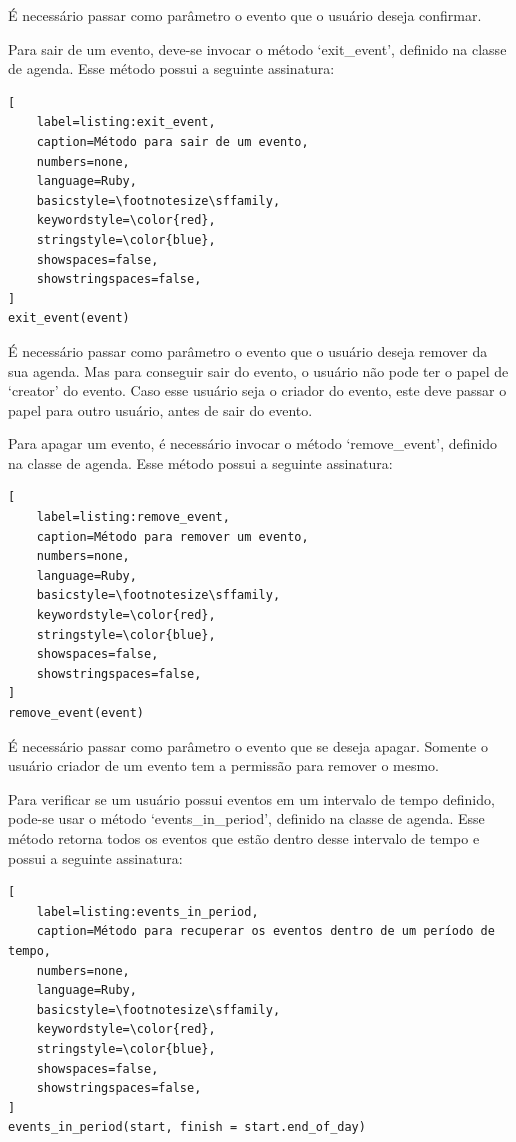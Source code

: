 É necessário passar como parâmetro o evento que o usuário deseja confirmar.

Para sair de um evento, deve-se invocar o método `exit\_event', definido na classe de agenda. Esse método possui a seguinte assinatura:

\begin{lstlisting}[
    label=listing:exit_event,
    caption=Método para sair de um evento,
    numbers=none,
    language=Ruby,
    basicstyle=\footnotesize\sffamily,
    keywordstyle=\color{red},
    stringstyle=\color{blue},
    showspaces=false,
    showstringspaces=false,
]
exit_event(event)
\end{lstlisting}

É necessário passar como parâmetro o evento que o usuário deseja remover da sua agenda. Mas para conseguir sair do evento, o usuário não pode ter o papel de `creator' do evento. Caso esse usuário seja o criador do evento, este deve passar o papel para outro usuário, antes de sair do evento.

Para apagar um evento, é necessário invocar o método `remove\_event', definido na classe de agenda. Esse método possui a seguinte assinatura:

\begin{lstlisting}[
    label=listing:remove_event,
    caption=Método para remover um evento,
    numbers=none,
    language=Ruby,
    basicstyle=\footnotesize\sffamily,
    keywordstyle=\color{red},
    stringstyle=\color{blue},
    showspaces=false,
    showstringspaces=false,
]
remove_event(event)
\end{lstlisting}

É necessário passar como parâmetro o evento que se deseja apagar. Somente o usuário criador de um evento tem a permissão para remover o mesmo.

Para verificar se um usuário possui eventos em um intervalo de tempo definido, pode-se usar o método `events\_in\_period', definido na classe de agenda. Esse método retorna todos os eventos que estão dentro desse intervalo de tempo e possui a seguinte assinatura:

\begin{lstlisting}[
    label=listing:events_in_period,
    caption=Método para recuperar os eventos dentro de um período de tempo,
    numbers=none,
    language=Ruby,
    basicstyle=\footnotesize\sffamily,
    keywordstyle=\color{red},
    stringstyle=\color{blue},
    showspaces=false,
    showstringspaces=false,
]
events_in_period(start, finish = start.end_of_day)
\end{lstlisting}

